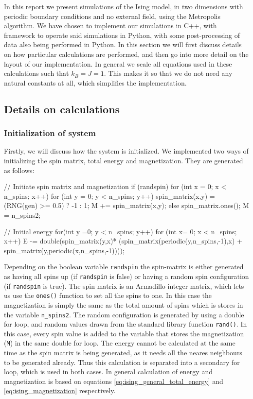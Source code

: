 \documentclass[reprint,english,notitlepage]{revtex4-1}  %
\begin{document}
In this report we present simulations of the Ising model, in two dimensions with periodic boundary conditions and no external field, using the Metropolis algorithm. We have chosen to implement our simulations in C++, with framework to operate said simulations in Python, with some post-processing of data also being performed in Python. In this section we will first discuss details on how particular calculations are performed, and then go into more detail on the layout of our implementation. In general we scale all equations used in these calculations such that $k_B = J = 1$. This makes it so that we do not need any natural constants at all, which simplifies the implementation. 

\subsection{Details on calculations} \label{sec:III:a}

\subsubsection{Initialization of system} \label{sec:III:a:i}

Firstly, we will discuss how the system is initialized. We implemented two ways of initializing the spin matrix, total energy and magnetization. They are generated as follows:

\begin{cpp}
// Initiate spin matrix and magnetization
if (randspin) {
  for (int x = 0; x < n_spins; x++) {
    for (int y = 0; y < n_spins; y++) {
      spin_matrix(x,y) = (RNG(gen) >= 0.5) ? -1 : 1;
      M += spin_matrix(x,y);
    }
  }
} else {
  spin_matrix.ones();
  M = n_spins2;
}


// Initial energy
for(int y =0; y < n_spins; y++) {
  for (int x= 0; x < n_spins; x++){
    E -=  double(spin_matrix(y,x)*
          (spin_matrix(periodic(y,n_spins,-1),x) +
          spin_matrix(y,periodic(x,n_spins,-1))));
  }
}
\end{cpp}

Depending on the boolean variable \verb+randspin+ the spin-matrix is either generated as having all spins up (if \verb+randspin+ is false) or having a random spin configuration (if \verb+randspin+ is true). The spin matrix is an Armadillo \citep{Armadillo} integer matrix, which lets us use the \verb+ones()+ function to set all the spins to one. In this case the magnetization is simply the same as the total amount of spins which is stores in the variable \verb+n_spins2+. The random configuration is generated by using a double for loop, and random values drawn from the standard library function \verb+rand()+. In this case, every spin value is added to the variable that stores the magnetization (\verb+M+) in the same double for loop. The energy cannot be calculated at the same time as the spin matrix is being generated, as it needs all the neares neighbours to be generated already. Thus this calculation is separated into a secondary for loop, which is used in both cases. In general calculation of energy and magnetization is based on equations  \eqref{eq:ising_general_total_energy} and \eqref{eq:ising_magnetization} respectively.
\end{document}
